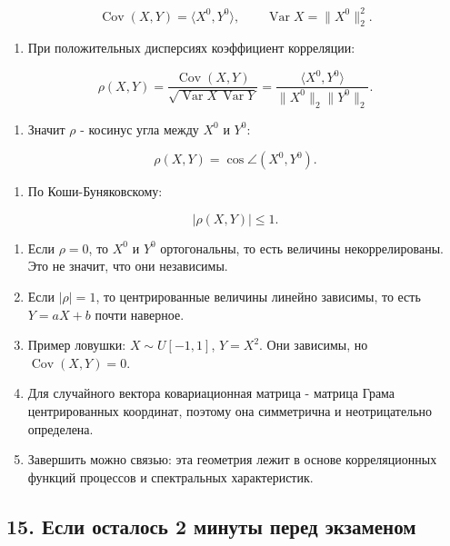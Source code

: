 \documentclass[
  11pt,
  a4paper,
]{article}
\providecommand{\tightlist}{%
  \setlength{\itemsep}{0pt}\setlength{\parskip}{0pt}}
\begin{document}
\[
\operatorname{Cov}(X,Y)=\langle X^0,Y^0\rangle,
\qquad
\operatorname{Var}X=\|X^0\|_2^2.
\]

\begin{enumerate}
\def\labelenumi{\arabic{enumi}.}
\setcounter{enumi}{4}
\tightlist
\item
  При положительных дисперсиях коэффициент корреляции:
\end{enumerate}

\[
\rho(X,Y)=
\frac{\operatorname{Cov}(X,Y)}
{\sqrt{\operatorname{Var}X\,\operatorname{Var}Y}}
=
\frac{\langle X^0,Y^0\rangle}{\|X^0\|_2\|Y^0\|_2}.
\]

\begin{enumerate}
\def\labelenumi{\arabic{enumi}.}
\setcounter{enumi}{5}
\tightlist
\item
  Значит \(\rho\) - косинус угла между \(X^0\) и \(Y^0\):
\end{enumerate}

\[
\rho(X,Y)=\cos\angle(X^0,Y^0).
\]

\begin{enumerate}
\def\labelenumi{\arabic{enumi}.}
\setcounter{enumi}{6}
\tightlist
\item
  По Коши-Буняковскому:
\end{enumerate}

\[
|\rho(X,Y)|\le1.
\]

\begin{enumerate}
\def\labelenumi{\arabic{enumi}.}
\setcounter{enumi}{7}
\tightlist
\item
  Если \(\rho=0\), то \(X^0\) и \(Y^0\) ортогональны, то есть величины
  некоррелированы. Это не значит, что они независимы.
\item
  Если \(|\rho|=1\), то центрированные величины линейно зависимы, то
  есть \(Y=aX+b\) почти наверное.
\item
  Пример ловушки: \(X\sim U[-1,1]\), \(Y=X^2\). Они зависимы, но
  \(\operatorname{Cov}(X,Y)=0\).
\item
  Для случайного вектора ковариационная матрица - матрица Грама
  центрированных координат, поэтому она симметрична и неотрицательно
  определена.
\item
  Завершить можно связью: эта геометрия лежит в основе корреляционных
  функций процессов и спектральных характеристик.
\end{enumerate}

\subsection{15. Если осталось 2 минуты перед
экзаменом}\label{ux435ux441ux43bux438-ux43eux441ux442ux430ux43bux43eux441ux44c-2-ux43cux438ux43dux443ux442ux44b-ux43fux435ux440ux435ux434-ux44dux43aux437ux430ux43cux435ux43dux43eux43c}
\end{document}
